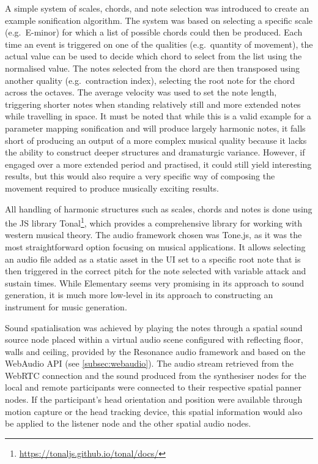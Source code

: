 A simple system of scales, chords, and note selection was introduced to create an example sonification algorithm.
The system was based on selecting a specific scale (e.g.\ E-minor) for which a list of possible chords could then be produced.
Each time an event is triggered on one of the qualities (e.g.\ quantity of movement), the actual value can be used to decide which chord to select from the list using the normalised value.
The notes selected from the chord are then transposed using another quality (e.g.\ contraction index), selecting the root note for the chord across the octaves.
The average velocity was used to set the note length, triggering shorter notes when standing relatively still and more extended notes while travelling in space.
It must be noted that while this is a valid example for a parameter mapping sonification and will produce largely harmonic notes, it falls short of producing an output of a more complex musical quality because it lacks the ability to construct deeper structures and dramaturgic variance.
However, if engaged over a more extended period and practised, it could still yield interesting results, but this would also require a very specific way of composing the movement required to produce musically exciting results.

All handling of harmonic structures such as scales, chords and notes is done using the \ac{JS} library Tonal\footnote{\url{https://tonaljs.github.io/tonal/docs/}}, which provides a comprehensive library for working with western musical theory.
The audio framework chosen was Tone.js, as it was the most straightforward option focusing on musical applications.
It allows selecting an audio file added as a static asset in the \ac{UI} set to a specific root note that is then triggered in the correct pitch for the note selected with variable attack and sustain times.
While Elementary seems very promising in its approach to sound generation, it is much more low-level in its approach to constructing an instrument for music generation.

Sound spatialisation was achieved by playing the notes through a spatial sound source node placed within a virtual audio scene configured with reflecting floor, walls and ceiling, provided by the Resonance audio framework and based on the WebAudio \ac{API} (see \autoref{subsec:webaudio}).
The audio stream retrieved from the \ac{WebRTC} connection and the sound produced from the synthesiser nodes for the local and remote participants were connected to their respective spatial panner nodes.
If the participant's head orientation and position were available through motion capture or the head tracking device, this spatial information would also be applied to the listener node and the other spatial audio nodes.

